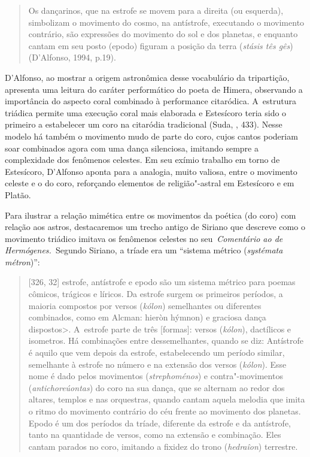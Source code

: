 \begin{quote}
Os dançarinos, que na estrofe se movem para a direita (ou esquerda),
simbolizam o movimento do cosmo, na antístrofe, executando o movimento
contrário, são expressões do movimento do sol e dos planetas, e enquanto
cantam em seu posto (epodo) figuram a posição da terra (\emph{stásis tês
gês}) (D'Alfonso, 1994, p.19).
\end{quote}

 

D'Alfonso, ao mostrar a origem astronômica desse vocabulário da
tripartição, apresenta uma leitura do caráter performático do poeta de
Himera, observando a importância do aspecto coral combinado à
performance citaródica. A~estrutura triádica permite uma execução coral
mais elaborada e Estesícoro teria sido o primeiro a estabelecer um coro
na citaródia tradicional (Suda, , 433). Nesse modelo há também o
movimento mudo de parte do coro, cujos cantos poderiam soar combinados
agora com uma dança silenciosa, imitando sempre a complexidade dos
fenômenos celestes. Em seu exímio trabalho em torno de Estesícoro,
D'Alfonso aponta para a analogia, muito valiosa, entre o movimento
celeste e o do coro, reforçando elementos de religião"-astral em
Estesícoro e em Platão.

Para ilustrar a relação mimética entre os movimentos da poética (do
coro) com relação aos astros, destacaremos um trecho antigo de Siriano
que descreve como o movimento triádico imitava os fenômenos celestes no
seu~\emph{Comentário ao de Hermógenes.~}Segundo Siriano, a tríade era um
``sistema métrico (\emph{systémata métron})'':

 

\begin{quote}
[326, 32] estrofe, antístrofe e epodo são um sistema métrico para
poemas cômicos, trágicos e líricos. Da estrofe surgem os primeiros
períodos, a maioria compostos por versos (\emph{kólon}) semelhantes ou
diferentes combinados, como em Alcman: hieròn hýmnon) e graciosa dança
dispostos\textgreater{}. A~estrofe parte de três [formas]: versos
(\emph{kólon}), dactílicos e isometros. Há combinações entre
dessemelhantes, quando se diz: Antístrofe é aquilo que vem depois da
estrofe, estabelecendo um período similar, semelhante à estrofe no
número e na extensão dos versos (\emph{kólon}). Esse nome é dado pelos
movimentos (\emph{strephoménos}) e contra"-movimentos
(\emph{antichoreúontas}) do coro na sua dança, que se alternam ao redor
dos altares, templos e nas orquestras, quando cantam aquela melodia que
imita o ritmo do movimento contrário do céu frente ao movimento dos
planetas. Epodo é um dos períodos da tríade, diferente da estrofe e da
antístrofe, tanto na quantidade de versos, como na extensão e
combinação. Eles cantam parados no coro, imitando a fixidez do trono
(\emph{hedraîon}) terrestre.
\end{quote}

